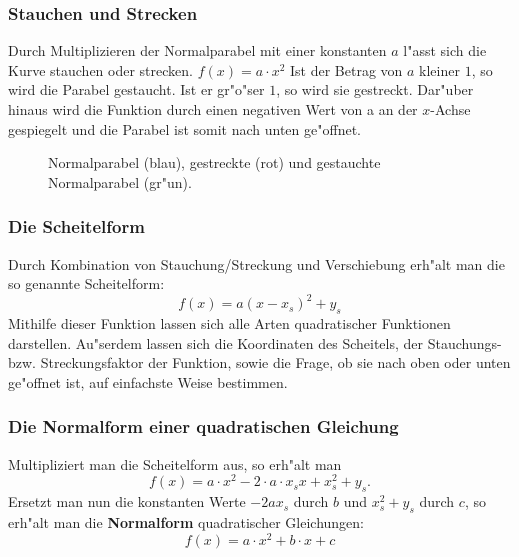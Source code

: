 \subsubsection{Stauchen und Strecken}
Durch Multiplizieren der Normalparabel mit einer konstanten $a$ l"asst sich die Kurve stauchen oder strecken. $f(x)=a \cdot x^2$ Ist der Betrag von $a$ kleiner $1$, so wird die Parabel gestaucht. Ist er gr"o"ser $1$, so wird sie gestreckt. Dar"uber hinaus wird die Funktion durch einen negativen Wert von a an der $x$-Achse gespiegelt und die Parabel ist somit nach unten ge"offnet.
\begin{figure}[h!]
\begin{center}
\end{center}
\caption{Normalparabel (blau), gestreckte (rot) und gestauchte Normalparabel (gr"un).}
\end{figure}

\subsubsection{Die Scheitelform}
Durch Kombination von Stauchung/Streckung und Verschiebung erh"alt man die so genannte Scheitelform: 
\begin{equation*}
f(x)=a(x-x_s)^2+y_s
\end{equation*}
Mithilfe dieser Funktion lassen sich alle Arten quadratischer Funktionen darstellen. Au"serdem lassen sich die Koordinaten des Scheitels, der Stauchungs- bzw. Streckungsfaktor der Funktion, sowie die Frage, ob sie nach oben oder unten ge"offnet ist, auf einfachste Weise bestimmen.

\subsubsection{Die Normalform einer quadratischen Gleichung}
Multipliziert man die Scheitelform aus, so erh"alt man 
\begin{equation*}
f(x)=a \cdot x^2-2 \cdot a \cdot x_sx+x_s^2+y_s.
\end{equation*}
Ersetzt man nun die konstanten Werte $-2ax_s$ durch $b$ und $x_s^2+y_s$ durch $c$, so erh"alt man die \textbf{Normalform} quadratischer Gleichungen:
\begin{equation*}
f(x)=a \cdot x^2+b \cdot x+c
\end{equation*}

